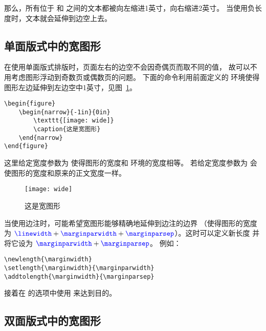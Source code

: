 那么，所有位于  和  之间的文本都被向左缩进1英寸，向右缩进2英寸。
当使用负长度时，文本就会延伸到边空上去。

\subsection{单面版式中的宽图形}\label{ssec:widefig-oneside}

在使用单面版式排版时，页面左右的边空不会因奇偶页而取不同的值，
故可以不用考虑图形浮动到奇数页或偶数页的问题。
下面的命令利用前面定义的  环境使得图形左边延伸到左边空中1英寸，见图~\ref{fig:widefig}。
\begin{lstlisting}
\begin{figure}
	\begin{narrow}{-1in}{0in}
		\texttt{[image: wide]}
		\caption{这是宽图形}
	\end{narrow}
\end{figure}
\end{lstlisting}
这里给定宽度参数为  使得图形的宽度和  环境的宽度相等。
若给定宽度参数为  会使图形的宽度和原来的正文宽度一样。

\begin{figure}
	\begin{narrow}{-1in}{0in}
		\texttt{[image: wide]}
		\caption{这是宽图形}\label{fig:widefig}
	\end{narrow}
\end{figure}

当使用边注时，可能希望宽图形能够精确地延伸到边注的边界
（使得图形的宽度为 $\text{\cmd{linewidth}}+\text{\cmd{marginparwidth}}+\text{\cmd{marginparsep}}$）。这时可以定义新长度  并将它设为 $\text{\cmd{marginparwidth}}+\text{\cmd{marginparsep}}$。
例如：
\begin{lstlisting}
\newlength{\marginwidth} 
\setlength{\marginwidth}{\marginparwidth} 
\addtolength{\marginwidth}{\marginparsep}
\end{lstlisting}
接着在  的选项中使用  来达到目的。

\subsection{双面版式中的宽图形}\label{widefig-twoside}

